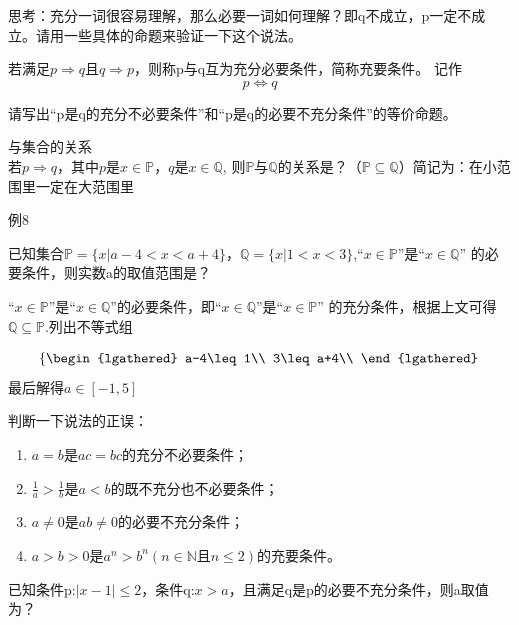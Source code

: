 思考：充分一词很容易理解，那么必要一词如何理解？即q不成立，p一定不成立。请用一些具体的命题来验证一下这个说法。
\begin{definition}
    若满足$p \Rightarrow q$且$q \Rightarrow p$，则称p与q互为充分必要条件，简称充要条件。
记作
\[p \Leftrightarrow q\]
\end{definition}

\begin{exercise}
    请写出“p是q的充分不必要条件”和“p是q的必要不充分条件”的等价命题。
\end{exercise}


与集合的关系
\\若$p \Rightarrow q$，其中$p$是$x \in \mathbb{P} $，$q$是$x \in \mathbb{Q} $,
则$\mathbb{P} $与$\mathbb{Q} $的关系是？（$\mathbb{P}\subseteq\mathbb{Q} $）简记为：在小范围里一定在大范围里

例8
\begin{example}
    已知集合$\mathbb{P} =\{x|a-4<x<a+4\}$，$\mathbb{Q} =\{x|1<x<3\}$,“$x \in \mathbb{P} $”是“$x \in \mathbb{Q} $”
的必要条件，则实数a的取值范围是？
\end{example}

\begin{jie}
    “$x \in \mathbb{P} $”是“$x \in \mathbb{Q} $”的必要条件，即“$x \in \mathbb{Q} $”是“$x \in \mathbb{P} $”
的充分条件，根据上文可得$\mathbb{Q} \subseteq \mathbb{P} $.列出不等式组

\[  
    \left\{
    \begin{lgathered}
    a-4\leq 1\\
    3\leq a+4\\
    \end{lgathered}
    \right.
\]
最后解得$a\in [-1,5]$
\end{jie}
\begin{exercise}
    判断一下说法的正误：
    \begin{enumerate}
        \item $a=b$是$ac=bc$的充分不必要条件；
        \item $\frac{1}{a}>\frac{1}{b}$是$a<b$的既不充分也不必要条件；
        \item $a\neq 0$是$ab \neq 0$的必要不充分条件；
        \item $a>b>0$是$a^n>b^n(n\in \mathbb{N}\text{且}n\leq2)$的充要条件。
    \end{enumerate}
\end{exercise}
\begin{exercise}
    已知条件p:$|x-1|\leq 2$，条件q:$x>a$，且满足q是p的必要不充分条件，则a取值为？
\end{exercise}


